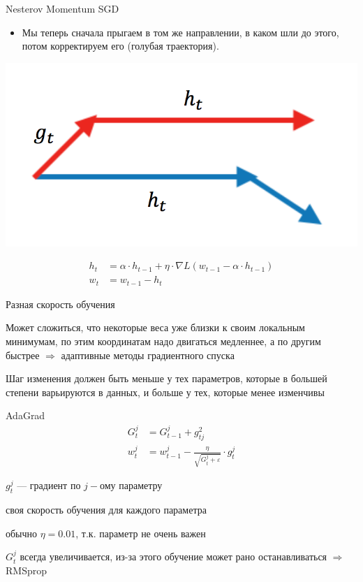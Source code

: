 \documentclass[notes,12pt, aspectratio=169]{beamer}
\newenvironment{wideitemize}{\itemize\addtolength{\itemsep}{10pt}}{\enditemize}
\begin{document}
\begin{frame}{Nesterov Momentum SGD}

\begin{itemize}
\item Мы теперь сначала прыгаем в том же направлении, в каком шли до этого, потом корректируем его (голубая траектория).
\end{itemize}

\begin{center}
	\includegraphics[width=.4\linewidth]{nesterov.png}
\end{center}

\begin{equation*}
\begin{aligned}
h_t &= \alpha \cdot h_{t-1} + \eta \cdot \nabla L(w_{t-1} - \alpha \cdot h_{t-1}) \\
w_t &= w_{t-1} - h_t
\end{aligned}	
\end{equation*}

\end{frame}


\begin{frame}{Разная скорость обучения}
\begin{wideitemize}
	\item Может сложиться, что некоторые веса уже близки к своим локальным минимумам, по этим координатам надо двигаться медленнее, а по другим быстрее $\Rightarrow$ {\color{red} адаптивные методы градиентного спуска }

	\item Шаг изменения должен быть меньше у тех параметров, которые в большей степени варьируются в данных, и больше у тех, которые менее изменчивы 
\end{wideitemize}
\end{frame}


\begin{frame}{AdaGrad}
\begin{equation*}
\begin{aligned}
G_t^j &= G_{t-1}^j + g_{tj}^2 \\
w_t^j &= w_{t-1}^j - \frac{\eta}{\sqrt{G_t^j + \varepsilon}} \cdot g_t^j
\end{aligned}	
\end{equation*}

\begin{wideitemize}
	\item  $g_t^j$ — градиент по $j-$ому параметру
	\item своя скорость обучения для каждого параметра
	\item обычно $\eta = 0.01$, т.к. параметр не очень важен
	\item $G_t^j$ всегда увеличивается, из-за этого обучение может рано останавливаться $\Rightarrow$  RMSprop
\end{wideitemize}
\end{frame}
\end{document}
